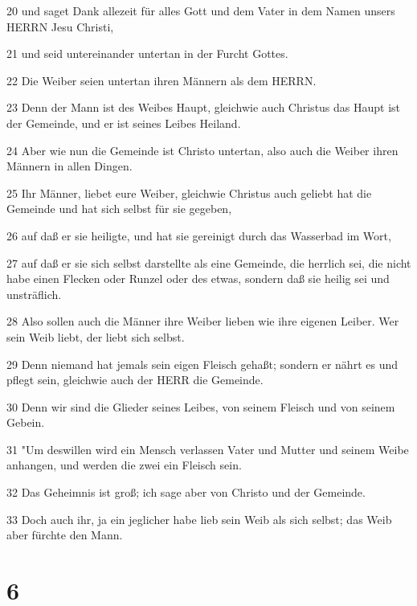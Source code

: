 \par 20 und saget Dank allezeit für alles Gott und dem Vater in dem Namen unsers HERRN Jesu Christi,
\par 21 und seid untereinander untertan in der Furcht Gottes.
\par 22 Die Weiber seien untertan ihren Männern als dem HERRN.
\par 23 Denn der Mann ist des Weibes Haupt, gleichwie auch Christus das Haupt ist der Gemeinde, und er ist seines Leibes Heiland.
\par 24 Aber wie nun die Gemeinde ist Christo untertan, also auch die Weiber ihren Männern in allen Dingen.
\par 25 Ihr Männer, liebet eure Weiber, gleichwie Christus auch geliebt hat die Gemeinde und hat sich selbst für sie gegeben,
\par 26 auf daß er sie heiligte, und hat sie gereinigt durch das Wasserbad im Wort,
\par 27 auf daß er sie sich selbst darstellte als eine Gemeinde, die herrlich sei, die nicht habe einen Flecken oder Runzel oder des etwas, sondern daß sie heilig sei und unsträflich.
\par 28 Also sollen auch die Männer ihre Weiber lieben wie ihre eigenen Leiber. Wer sein Weib liebt, der liebt sich selbst.
\par 29 Denn niemand hat jemals sein eigen Fleisch gehaßt; sondern er nährt es und pflegt sein, gleichwie auch der HERR die Gemeinde.
\par 30 Denn wir sind die Glieder seines Leibes, von seinem Fleisch und von seinem Gebein.
\par 31 "Um deswillen wird ein Mensch verlassen Vater und Mutter und seinem Weibe anhangen, und werden die zwei ein Fleisch sein.
\par 32 Das Geheimnis ist groß; ich sage aber von Christo und der Gemeinde.
\par 33 Doch auch ihr, ja ein jeglicher habe lieb sein Weib als sich selbst; das Weib aber fürchte den Mann.

\chapter{6}

